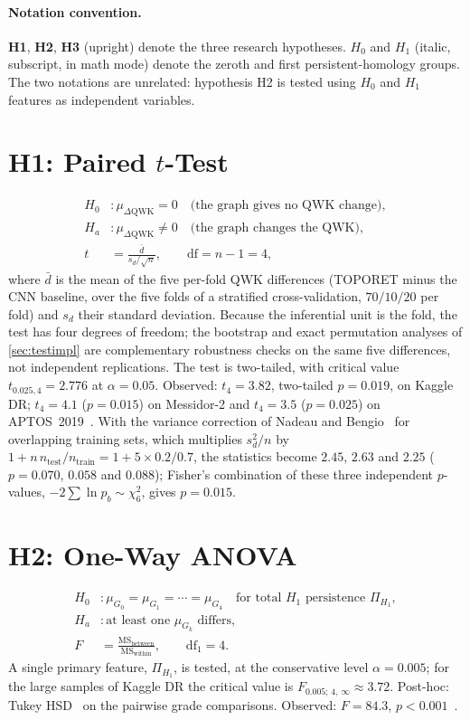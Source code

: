 \paragraph{Notation convention.}
\textbf{H1}, \textbf{H2}, \textbf{H3} (upright) denote the three research hypotheses.
$H_0$ and $H_1$ (italic, subscript, in math mode) denote the zeroth and first
persistent-homology groups. The two notations are unrelated: hypothesis H2 is tested
using $H_0$ and $H_1$ features as independent variables.


\section{H1: Paired \texorpdfstring{$t$}{t}-Test}
\label{sec:app-h1}
\begin{align}
H_0 &: \mu_{\Delta\mathrm{QWK}} = 0 \quad \text{(the graph gives no QWK change)}, \\
H_a &: \mu_{\Delta\mathrm{QWK}} \neq 0 \quad \text{(the graph changes the QWK)}, \\
t &= \frac{\bar d}{s_d/\sqrt{n}}, \qquad \mathrm{df}=n-1=4,
\end{align}
where $\bar d$ is the mean of the five per-fold QWK differences (TOPORET minus the CNN
baseline, over the five folds of a stratified cross-validation, $70/10/20$ per fold) and $s_d$
their standard deviation. Because the inferential unit is the fold, the test has four
degrees of freedom; the bootstrap and exact
permutation analyses of \cref{sec:testimpl} are complementary robustness checks on the
same five differences, not independent replications. The test is two-tailed, with
critical value $t_{0.025,4}=2.776$ at $\alpha=0.05$. Observed: $t_4=3.82$, two-tailed
$p=0.019$, on Kaggle DR; $t_4=4.1$ ($p=0.015$) on Messidor-2 and
$t_4=3.5$ ($p=0.025$) on APTOS~2019~\cite{belhadj2025plos}. With the variance correction of
Nadeau and Bengio~\cite{nadeau2003inference} for overlapping training sets, which multiplies
$s_d^2/n$ by $1+n\,n_{\mathrm{test}}/n_{\mathrm{train}}=1+5\times0.2/0.7$, the statistics become
$2.45$, $2.63$ and $2.25$ ($p=0.070$, $0.058$ and $0.088$); Fisher's combination of these three
independent $p$-values, $-2\sum\ln p_b\sim\chi^2_6$, gives $p=0.015$.

\section{H2: One-Way ANOVA}
\label{sec:app-h2}
\begin{align}
H_0 &: \mu_{G_0}=\mu_{G_1}=\cdots=\mu_{G_4} \quad \text{for total $H_1$ persistence } \Pi_{H_1}, \\
H_a &: \text{at least one } \mu_{G_k} \text{ differs}, \\
F &= \frac{\mathrm{MS}_{\mathrm{between}}}{\mathrm{MS}_{\mathrm{within}}}, \qquad
\mathrm{df}_1=4 .
\end{align}
A single primary feature, $\Pi_{H_1}$, is tested, at the conservative level $\alpha=0.005$;
for the large samples of Kaggle DR the critical value is $F_{0.005;\,4,\,\infty}\approx3.72$.
Post-hoc: Tukey HSD~\cite{tukey1949} on the pairwise grade comparisons. Observed:
$F=84.3$, $p<0.001$~\cite{belhadj2025plos}.

